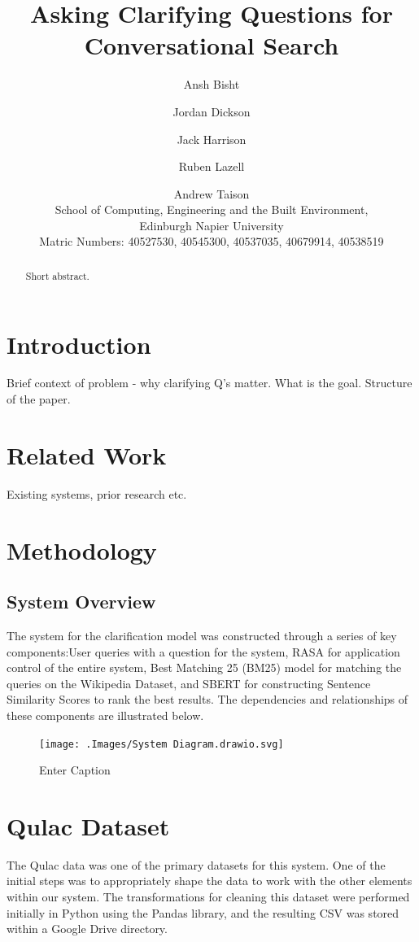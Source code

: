 \documentclass[11pt]{article}
\title{Asking Clarifying Questions for Conversational Search}
\author{
  Ansh Bisht \and
  Jordan Dickson \and
  Jack Harrison \and
  Ruben Lazell \and
  Andrew Taison  \\
  School of Computing, Engineering and the Built Environment, \\
  Edinburgh Napier University \\
  Matric Numbers: 40527530, 40545300, 40537035, 40679914, 40538519
}
\begin{document}
\maketitle
\begin{abstract}
Short abstract.
\end{abstract}


\section{Introduction}
Brief context of problem - why clarifying Q's matter.
What is the goal.
Structure of the paper.

\section{Related Work}
Existing systems, prior research etc.

\section{Methodology}



\subsection{System Overview}
The system for the clarification model was constructed through a series of key components:User queries with a question for the system, RASA for application control of the entire system, Best Matching 25 (BM25) model for matching the queries on the Wikipedia Dataset, and SBERT for constructing Sentence Similarity Scores to rank the best results. The dependencies and relationships of these components are illustrated below.

\begin{figure}[htbp]
  \texttt{[image: .Images/System Diagram.drawio.svg]}
  \caption{Enter Caption}
  \label{fig:enter-label}
\end{figure}

\section{Qulac Dataset}
The Qulac data was one of the primary datasets for this system. One of the initial steps was to appropriately shape the data to work with the other elements within our system. The transformations for cleaning this dataset were performed initially in Python using the Pandas library, and the resulting CSV was stored within a Google Drive directory.
\end{document}
